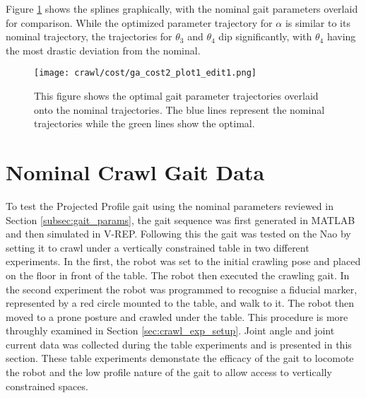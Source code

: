 Figure \ref{fig:optimal_gait_parameters} shows the splines graphically, with the nominal gait parameters
overlaid for comparison. While the optimized parameter trajectory for $\alpha$ is similar to its nominal
trajectory, the trajectories for $\theta_3$ and $\theta_4$ dip significantly, with $\theta_4$ having the
most drastic deviation from the nominal.

\begin{figure}
  \centerline{
    \texttt{[image: crawl/cost/ga\_cost2\_plot1\_edit1.png]}
  }
  \caption{This figure shows the optimal gait parameter trajectories overlaid onto the nominal
           trajectories. The blue lines represent the nominal trajectories while the green
           lines show the optimal.}
  \label{fig:optimal_gait_parameters}
\end{figure}




\FloatBarrier
\section{Nominal Crawl Gait Data} \label{sec:nom_crawl_data}

To test the Projected Profile gait using the nominal parameters reviewed in 
Section \ref{subsec:gait_params}, the gait sequence was first generated in
MATLAB and then simulated in V-REP. Following this the gait was tested on the
Nao by setting it to crawl under a vertically constrained table in two different
experiments. In the first, the robot was set to the initial crawling pose and
placed on the floor in front of the table. The robot then executed the crawling gait.
In the second experiment the robot was programmed to recognise a fiducial marker,
represented by a red circle mounted to the table, and walk to it. 
The robot then moved to a prone posture and crawled under the table. This procedure
is more throughly examined in Section \ref{sec:crawl_exp_setup}. Joint angle and joint
current data was collected during the table experiments and is presented in this section.
These table experiments demonstate the efficacy of the gait to locomote the robot
and the low profile nature of the gait to allow access to vertically constrained spaces.

